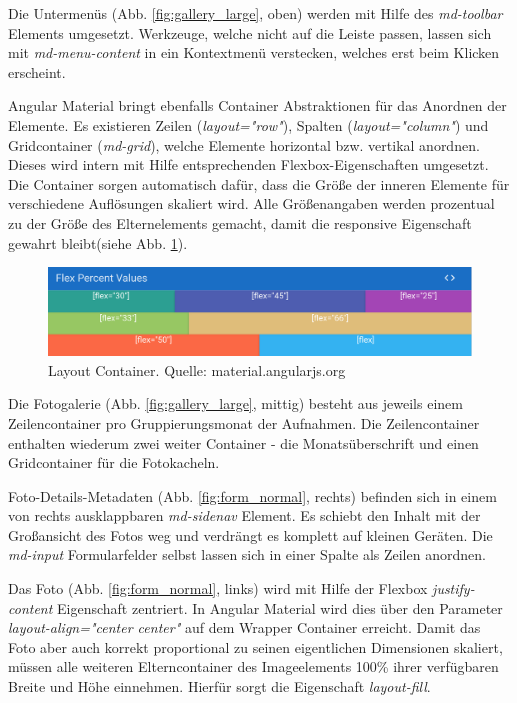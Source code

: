 Die Untermenüs (Abb. \ref{fig:gallery_large}, oben) werden mit Hilfe des \textit{md-toolbar} Elements umgesetzt. Werkzeuge, welche nicht auf die Leiste passen, lassen sich mit \textit{md-menu-content} in ein Kontextmenü verstecken, welches erst beim Klicken erscheint.

Angular Material bringt ebenfalls Container Abstraktionen für das Anordnen der Elemente. Es existieren Zeilen (\textit{layout="row"}), Spalten (\textit{layout="column"}) und Gridcontainer (\textit{md-grid}), welche Elemente horizontal bzw. vertikal anordnen. Dieses wird intern  mit Hilfe entsprechenden Flexbox-Eigenschaften umgesetzt. Die Container sorgen automatisch dafür, dass die Größe der inneren Elemente für verschiedene Auflösungen skaliert wird. Alle Größenangaben werden prozentual zu der Größe des Elternelements gemacht, damit die responsive Eigenschaft gewahrt bleibt(siehe Abb. \ref{fig:layout_container}).

\begin{figure}[htp]     %
\centering
\includegraphics[width=1.0\textwidth]{images/layout_container}
\caption{Layout Container. Quelle: material.angularjs.org}\label{fig:layout_container}
\end{figure}

Die Fotogalerie (Abb. \ref{fig:gallery_large}, mittig) besteht aus jeweils einem Zeilencontainer pro Gruppierungsmonat der Aufnahmen. Die Zeilencontainer enthalten wiederum zwei weiter Container - die Monatsüberschrift und einen Gridcontainer für die Fotokacheln.

Foto-Details-Metadaten (Abb. \ref{fig:form_normal}, rechts) befinden sich in einem von rechts ausklappbaren \textit{md-sidenav} Element. Es schiebt den Inhalt mit der Großansicht des Fotos weg und verdrängt es komplett auf kleinen Geräten. Die \textit{md-input} Formularfelder selbst lassen sich in einer Spalte als Zeilen anordnen.

Das Foto (Abb. \ref{fig:form_normal}, links) wird mit Hilfe der Flexbox \textit{justify-content} Eigenschaft zentriert. In Angular Material wird dies über den Parameter \textit{layout-align="center center"} auf dem Wrapper Container erreicht. Damit das Foto aber auch korrekt proportional zu seinen eigentlichen Dimensionen skaliert, müssen alle weiteren Elterncontainer des Imageelements 100\% ihrer verfügbaren Breite und Höhe einnehmen. Hierfür sorgt die Eigenschaft \textit{layout-fill}.

